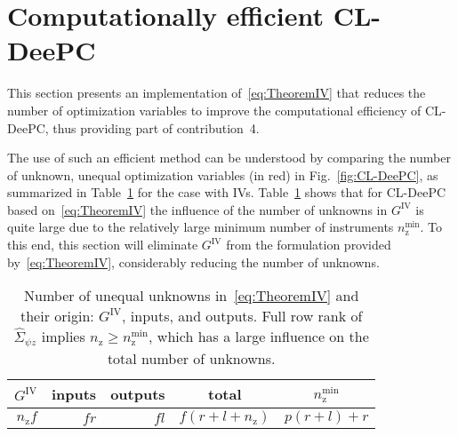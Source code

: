 \section{Computationally efficient \acs{CL-DeePC}}\label{sec:Sequential}
\noindent This section presents an implementation of~\eqref{eq:TheoremIV} that reduces the number of optimization variables to improve the computational efficiency of \ac{CL-DeePC}, thus providing part of contribution~4.
%

The use of such an efficient method can be understood by comparing the number of unknown, unequal optimization variables (in red) in Fig.~\ref{fig:CL-DeePC}, as summarized in Table~\ref{tab:unknowns} for the case with \ac{IVs}. Table~\ref{tab:unknowns} shows that for \ac{CL-DeePC} based on~\eqref{eq:TheoremIV} the influence of the number of unknowns in $G^\mathrm{IV}$ is quite large due to the relatively large minimum number of instruments $n_\mathrm{z}^\mathrm{min}$. To this end, this section will eliminate $G^\mathrm{IV}$ from the formulation provided by~\eqref{eq:TheoremIV}, considerably reducing the number of unknowns.

\begin{table}[t!]
    \centering
    \begin{tabular}{rrrcc}
        $G^\mathrm{IV}$ & inputs & outputs & total & $n_\mathrm{z}^\mathrm{min}$\\\hline
        $n_\mathrm{z}f$ & $fr$ & $fl$ & $f(r+l+n_\mathrm{z})$ & $p(r+l)+r$\\
    \end{tabular}
    \caption{Number of unequal unknowns in~\eqref{eq:TheoremIV} and their origin: $G^\mathrm{IV}$, inputs, and outputs. Full row rank of $\hat{\Sigma}_{\psi z}$ implies $n_\mathrm{z}\geq n_\mathrm{z}^\mathrm{min}$, which has a large influence on the total number of unknowns.}
    \label{tab:unknowns}
\end{table}

